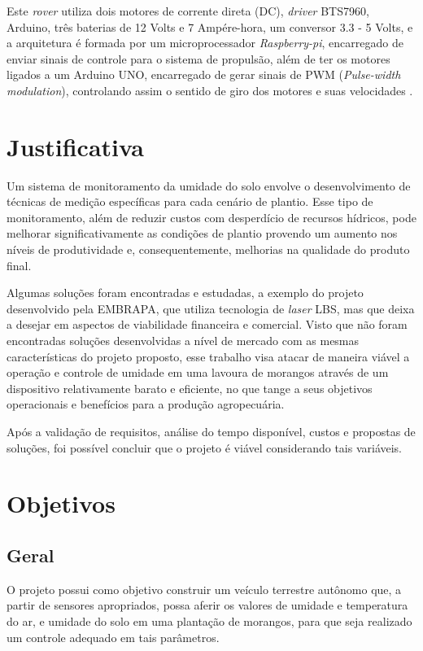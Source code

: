   Este \textit{rover} utiliza dois motores de corrente direta (DC), \textit{driver} BTS7960, Arduino, três
  baterias de 12 Volts e 7 Ampére-hora, um conversor 3.3 - 5 Volts, e a arquitetura
  é formada por um microprocessador \textit{Raspberry-pi}, encarregado de enviar sinais
  de controle para o sistema de propulsão, além de ter os motores ligados a um
  Arduino UNO, encarregado de gerar sinais de PWM (\textit{Pulse-width modulation}),
  controlando assim o sentido de giro dos motores e suas velocidades \cite{ARGOTE2014}.

  \section{Justificativa}

  Um sistema de monitoramento da umidade do solo envolve o desenvolvimento de
  técnicas de medição específicas para cada cenário de plantio. Esse tipo de
  monitoramento, além de reduzir custos com desperdício de recursos hídricos,
  pode melhorar significativamente as condições de plantio provendo um aumento
  nos níveis de produtividade e, consequentemente, melhorias na qualidade do
  produto final.

  Algumas soluções foram encontradas e estudadas, a exemplo do projeto
  desenvolvido pela EMBRAPA, que utiliza tecnologia de \textit{laser} LBS, mas que deixa
  a desejar em aspectos de viabilidade financeira e comercial. Visto que não
  foram encontradas soluções desenvolvidas a nível de mercado com as mesmas
  características do projeto proposto, esse trabalho visa atacar
  de maneira viável a operação e controle de umidade em uma lavoura de morangos
  através de um dispositivo relativamente barato e eficiente, no que tange a seus
  objetivos operacionais e benefícios para a produção agropecuária.

  Após a validação de requisitos, análise do tempo disponível, custos e propostas
  de soluções, foi possível concluir que o projeto é viável considerando tais variáveis.

  \section{Objetivos}

  \subsection{Geral}

  O projeto possui como objetivo construir um veículo terrestre autônomo que,
  a partir de sensores apropriados, possa aferir os valores de umidade e temperatura do ar, e
  umidade do solo em uma plantação de morangos, para que seja realizado
  um controle adequado em tais parâmetros.

